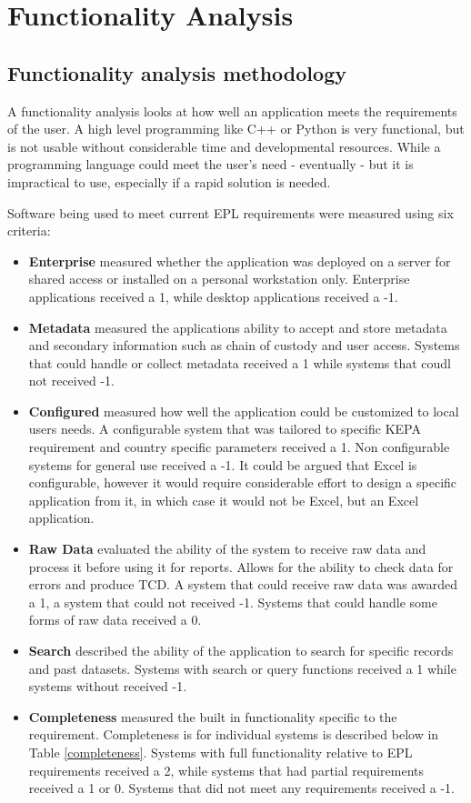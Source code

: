 \chapter{Functionality Analysis}

\section{Functionality analysis methodology}
A functionality analysis looks at how well an application meets the requirements of the user. A high level programming like C++ or Python is very functional, but is not usable without considerable time and developmental resources. While a programming language could meet the user's need - eventually - but it is impractical to use, especially if a rapid solution is needed.

Software being used to meet current EPL requirements were measured using six criteria:

\begin{itemize}
\item \textbf{Enterprise} measured whether the application was deployed on a server for shared access or installed on a personal workstation only. Enterprise applications received a 1, while desktop applications received a -1. 
\item \textbf{Metadata} measured the applications ability to accept and store metadata and secondary information such as chain of custody and user access. Systems that could handle or collect metadata received a 1 while systems that coudl not received -1.
\item \textbf{Configured} measured how well the application could be customized to local users needs. A configurable system that was tailored to specific KEPA requirement and country specific parameters received a 1. Non configurable systems for general use received a -1. It could be argued that Excel is configurable, however it would require considerable effort to design a specific application from it, in which case it would not be Excel, but an Excel application.
\item \textbf{Raw Data} evaluated the ability of the system to receive raw data and process it before using it for reports. Allows for the ability to check data for errors and produce TCD. A system that could receive raw data was awarded a 1, a system that could not received -1. Systems that could handle some forms of raw data received a 0.
\item \textbf{Search} described the ability of the application to search for specific records and past datasets. Systems with search or query functions received a 1 while systems without received -1.
\item \textbf{Completeness} measured the built in functionality specific to the requirement. Completeness is for individual systems is described below in Table \ref{completeness}. Systems with full functionality relative to EPL requirements received a 2, while systems that had partial requirements received a 1 or 0. Systems that did not meet any requirements received a -1.
\end{itemize}

